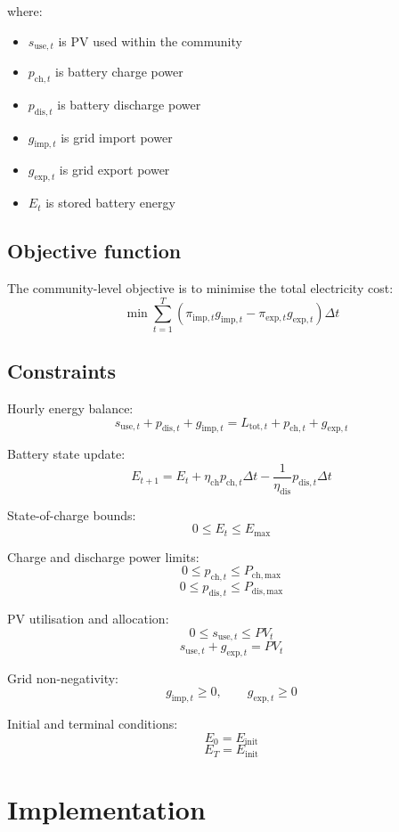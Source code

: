 \documentclass[12pt,a4paper]{article}
\begin{document}
where:

\begin{itemize}
    \item $s_{\mathrm{use},t}$ is PV used within the community
    \item $p_{\mathrm{ch},t}$ is battery charge power
    \item $p_{\mathrm{dis},t}$ is battery discharge power
    \item $g_{\mathrm{imp},t}$ is grid import power
    \item $g_{\mathrm{exp},t}$ is grid export power
    \item $E_t$ is stored battery energy
\end{itemize}

\subsection{Objective function}

The community-level objective is to minimise the total electricity cost:
\[
\min \sum_{t=1}^{T} \left( \pi_{\mathrm{imp},t} g_{\mathrm{imp},t} - \pi_{\mathrm{exp},t} g_{\mathrm{exp},t} \right)\Delta t
\]

\subsection{Constraints}

Hourly energy balance:
\[
s_{\mathrm{use},t} + p_{\mathrm{dis},t} + g_{\mathrm{imp},t}
=
L_{\mathrm{tot},t} + p_{\mathrm{ch},t} + g_{\mathrm{exp},t}
\]

Battery state update:
\[
E_{t+1} = E_t + \eta_{\mathrm{ch}} p_{\mathrm{ch},t}\Delta t - \frac{1}{\eta_{\mathrm{dis}}}p_{\mathrm{dis},t}\Delta t
\]

State-of-charge bounds:
\[
0 \le E_t \le E_{\max}
\]

Charge and discharge power limits:
\[
0 \le p_{\mathrm{ch},t} \le P_{\mathrm{ch,max}}
\]
\[
0 \le p_{\mathrm{dis},t} \le P_{\mathrm{dis,max}}
\]

PV utilisation and allocation:
\[
0 \le s_{\mathrm{use},t} \le PV_t
\]
\[
s_{\mathrm{use},t} + g_{\mathrm{exp},t} = PV_t
\]

Grid non-negativity:
\[
g_{\mathrm{imp},t} \ge 0,\qquad g_{\mathrm{exp},t} \ge 0
\]

Initial and terminal conditions:
\[
E_0 = E_{\mathrm{init}}
\]
\[
E_T = E_{\mathrm{init}}
\]

\section{Implementation}
\end{document}
